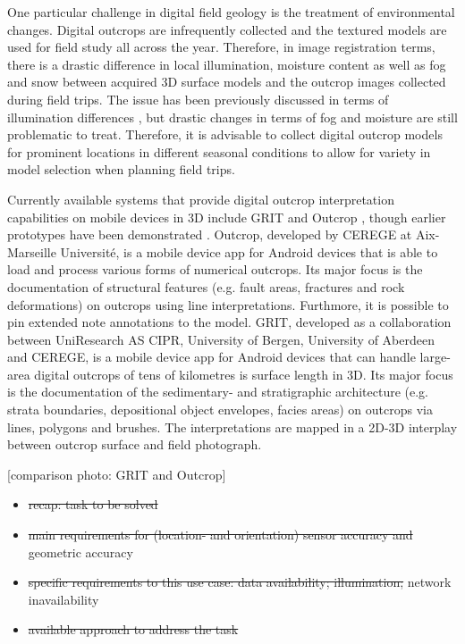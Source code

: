 \documentclass[review]{elsarticle}
\begin{document}
One particular challenge in digital field geology is the treatment of environmental changes. Digital outcrops are infrequently collected and the textured models are used for field study all across the year. Therefore, in image registration terms, there is a drastic difference in local illumination, moisture content as well as fog and snow between acquired 3D surface models and the outcrop images collected during field trips. The issue has been previously discussed in terms of illumination differences \cite{Kehl2017_PHOR}, but drastic changes in terms of fog and moisture are still problematic to treat. Therefore, it is advisable to collect digital outcrop models for prominent locations in different seasonal conditions to allow for variety in model selection when planning field trips.

Currently available systems that provide digital outcrop interpretation capabilities on mobile devices in 3D include \gls{GRIT} \cite{Kehl2016_VGCabstract} and Outcrop \cite{Viseur2014_VGCabstract}, though earlier prototypes have been demonstrated \cite{Hama2013}. Outcrop, developed by \gls{CEREGE} at Aix-Marseille Universit\'{e}, is a mobile device app for Android devices that is able to load and process various forms of numerical outcrops. Its major focus is the documentation of structural features (e.g. fault areas, fractures and rock deformations) on outcrops using line interpretations. Furthmore, it is possible to pin extended note annotations to the model. \gls{GRIT}, developed as a collaboration between UniResearch AS CIPR, University of Bergen, University of Aberdeen and \gls{CEREGE}, is a mobile device app for Android devices that can handle large-area digital outcrops of tens of kilometres is surface length in 3D. Its major focus is the documentation of the sedimentary- and stratigraphic architecture (e.g. strata boundaries, depositional object envelopes, facies areas) on outcrops via lines, polygons and brushes. The interpretations are mapped in a 2D-3D interplay between outcrop surface and field photograph.

[comparison photo: GRIT and Outcrop]

\begin{itemize}
\item \sout{recap: task to be solved}
\item \sout{main requirements for (location- and orientation) sensor accuracy and} geometric accuracy
\item \sout{specific requirements to this use case: data availability; illumination;} network inavailability
\item \sout{available approach to address the task}
\end{itemize}
\end{document}

